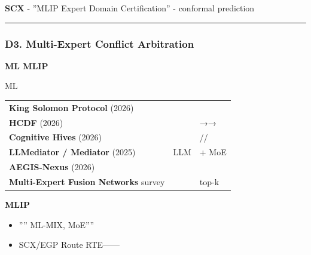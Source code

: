 \documentclass[
  12pt,
]{article}
\providecommand{\tightlist}{%
  \setlength{\itemsep}{0pt}\setlength{\parskip}{0pt}}
\begin{document}
\textbf{SCX } - ''MLIP Expert
Domain Certification'' -  conformal prediction


\begin{center}\rule{0.5\linewidth}{0.5pt}\end{center}

\subsubsection{D3. Multi-Expert Conflict
Arbitration}\label{d3.-multi-expert-conflict-arbitrationux591aux4e13ux5bb6ux51b2ux7a81ux4ef2ux88c1}

\textbf{ ML  MLIP }

 ML 

\begin{longtable}[]{@{}
  >{\raggedright\arraybackslash}p{}
  >{\raggedright\arraybackslash}p{}
  >{\raggedright\arraybackslash}p{}@{}}
\toprule\noalign{}
\begin{minipage}[b]{\linewidth}\raggedright

\end{minipage} & \begin{minipage}[b]{\linewidth}\raggedright

\end{minipage} & \begin{minipage}[b]{\linewidth}\raggedright

\end{minipage} \\
\midrule\noalign{}
\endhead
\bottomrule\noalign{}
\endlastfoot
\textbf{King Solomon Protocol} (2026) &  &
 \\
\textbf{HCDF} (2026) &  &
→→ \\
\textbf{Cognitive Hives} (2026) &  &
// \\
\textbf{LLMediator / Mediator} (2025) & LLM  &
 +  MoE \\
\textbf{AEGIS-Nexus} (2026) &  &
 \\
\textbf{Multi-Expert Fusion Networks} survey &  &
top-k  \\
\end{longtable}

\textbf{MLIP }

\begin{itemize}
\tightlist
\item
  '''' ML-MIX, 
  MoE''''
\item
  SCX/EGP  Route
  RTE------
\end{itemize}
\end{document}
